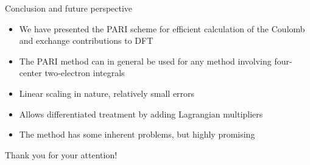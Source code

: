 
\begin{frame}{Conclusion and future perspective}
\footnotesize
\begin{itemize}
\item We have presented the PARI scheme for efficient calculation of the Coulomb 
     and exchange contributions to DFT
\item The PARI method can in general be used for any method involving four-center two-electron
     integrals
\item Linear scaling in nature, relatively small errors
\item Allows differentiated treatment by adding Lagrangian multipliers
\item The method has some inherent problems, but highly promising
\end{itemize}
\begin{center}
{\red Thank you for your attention! }
\end{center}
\end{frame}
%


